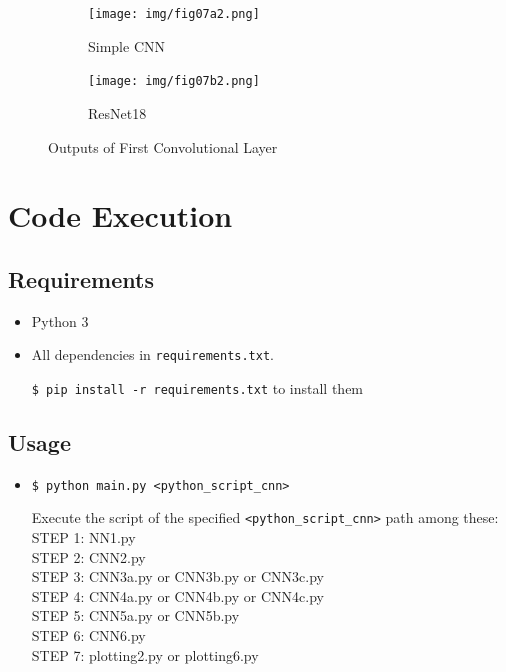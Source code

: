 \documentclass[a4paper, 11pt]{article}
\begin{document}
	\begin{figure}[h!]
		\centering
		\begin{subfigure}[b]{1\textwidth}
			\centering
			\texttt{[image: img/fig07a2.png]}
			\caption{Simple CNN}
		\end{subfigure}
		
		\begin{subfigure}[b]{1\textwidth}
			\centering
			\texttt{[image: img/fig07b2.png]}
			\caption{ResNet18}
			\label{fig:07bb}
		\end{subfigure}
		\caption{Outputs of First Convolutional Layer}				\label{fig:07b}
	\end{figure}
	

	
	\clearpage
	\section{Code Execution}
	\subsection{Requirements}
	\begin{itemize}
		\item Python 3
		\item All dependencies in \texttt{requirements.txt}.
		
		\texttt{\$ pip install -r requirements.txt} to install them
	\end{itemize}
	\subsection{Usage}
	\begin{itemize}
		\item \texttt{\$ python main.py <python\_script\_cnn>}
		
		Execute the script of the specified \texttt{<python\_script\_cnn>} path among these: \\
		STEP 1: NN1.py\\
		STEP 2: CNN2.py\\
		STEP 3: CNN3a.py or CNN3b.py or CNN3c.py\\
		STEP 4: CNN4a.py or CNN4b.py or CNN4c.py\\
		STEP 5: CNN5a.py or CNN5b.py\\
		STEP 6: CNN6.py\\
		STEP 7: plotting2.py or plotting6.py\\
		
	\end{itemize}
	
\end{document}
